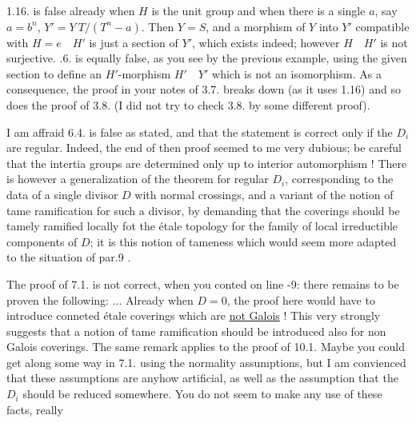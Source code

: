 1.16. is false already when $H$ is the unit group and when there is a single $a$, say $a=b^n$, $Y'=Y\ T/(T^n-a)$. Then $Y=S$, and a morphism of $Y$ into $Y'$ compatible with $H=e\quad H'$ is just a section of $Y'$, which exists indeed; however $H\quad H'$ is not surjective. .6. is equally false, as you see by the previous example, using the given section to define an $H'$-morphism $H'\quad Y'$ which is not an isomorphism. As a consequence, the proof in your notes of 3.7. breaks down (as it uses 1.16) and so does the proof of 3.8. (I did not try to check 3.8. by some different proof).

I am affraid  6.4. is false as stated, and that the statement is correct only if the $D_i$ are regular. Indeed, the end of then  proof seemed to me very dubious; be careful that the intertia groups are determined only up to interior automorphism ! There is however a  generalization of the theorem for regular $D_i$, corresponding to the data of a single divisor $D$ with normal crossings, and a variant of the notion of tame ramification for such a divisor, by demanding that the coverings should be tamely ramified locally fot the étale topology for the family of local irreductible components of $D$; it is this notion of tameness which would seem more adapted to the situation of par.9 .

\normalmarginpar
{}
The proof of 7.1. is not correct, when you conted on line -9: there remains to be proven the following: ... Already when $D=0$, the proof here would have to introduce conneted étale coverings which are \uline{not Galois} ! This very strongly suggests that a notion of tame ramification should be introduced also  for non Galois coverings. The same remark applies to the proof of 10.1. Maybe you could get along some way in 7.1. using the normality assumptions, but I am convienced that these assumptions are anyhow artificial, as well as the assumption that the $D_i$ should be reduced somewhere. You do not seem to make any use of these facts, really

